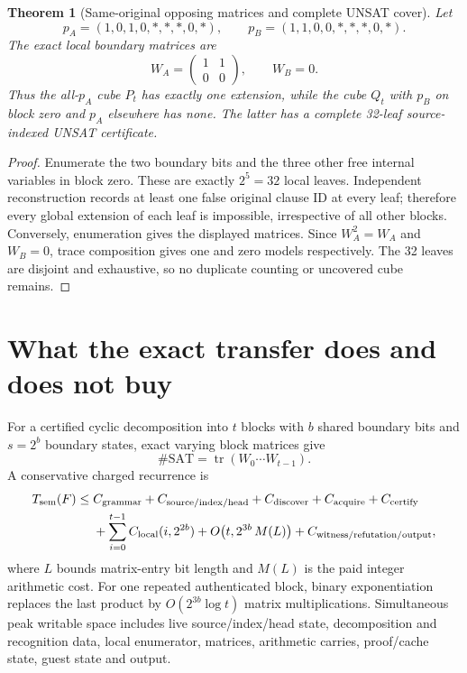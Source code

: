 \documentclass[11pt]{article}
\newtheorem{theorem}{Theorem}
\begin{document}
\begin{theorem}[Same-original opposing matrices and complete UNSAT cover]
Let
\[
p_A=(1,0,1,0,*,*,*,0,*),\qquad
p_B=(1,1,0,0,*,*,*,0,*).
\]
The exact local boundary matrices are
\[
 W_A=\begin{pmatrix}1&1\\0&0\end{pmatrix},\qquad W_B=0.
\]
Thus the all-$p_A$ cube $P_t$ has exactly one extension, while the cube $Q_t$ with $p_B$ on block zero and $p_A$ elsewhere has none.  The latter has a complete 32-leaf source-indexed UNSAT certificate.
\end{theorem}
\begin{proof}
Enumerate the two boundary bits and the three other free internal variables in block zero.  These are exactly $2^5=32$ local leaves.  Independent reconstruction records at least one false original clause ID at every leaf; therefore every global extension of each leaf is impossible, irrespective of all other blocks.  Conversely, enumeration gives the displayed matrices.  Since $W_A^2=W_A$ and $W_B=0$, trace composition gives one and zero models respectively.  The 32 leaves are disjoint and exhaustive, so no duplicate counting or uncovered cube remains.
\end{proof}

\section{What the exact transfer does and does not buy}
For a certified cyclic decomposition into $t$ blocks with $b$ shared boundary bits and $s=2^b$ boundary states, exact varying block matrices give
\[
 \#\mathrm{SAT}=\operatorname{tr}(W_0\cdots W_{t-1}).
\]
A conservative charged recurrence is
\[
\begin{split}
T_{\rm sem}(F)\le{}&C_{\rm grammar}+C_{\rm source/index/head}+C_{\rm discover}
 +C_{\rm acquire}+C_{\rm certify}\\
&+\sum_{i=0}^{t-1}C_{\rm local}(i,2^{2b})
 +O\!\left(t,2^{3b}\,M(L)\right)+C_{\rm witness/refutation/output},
\end{split}
\]
where $L$ bounds matrix-entry bit length and $M(L)$ is the paid integer arithmetic cost.  For one repeated authenticated block, binary exponentiation replaces the last product by $O(2^{3b}\log t)$ matrix multiplications.  Simultaneous peak writable space includes live source/index/head state, decomposition and recognition data, local enumerator, matrices, arithmetic carries, proof/cache state, guest state and output.
\end{document}
